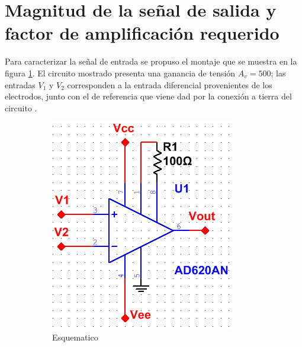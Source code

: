 \section{Magnitud de la señal de salida y factor de amplificación requerido}
Para caracterizar la señal de entrada se propuso el montaje que se muestra en la figura \ref{fig:esquematico}. El circuito mostrado presenta una ganancia de tensión $A_v = 500$; las entradas $V_1$ y $V_2$ corresponden a la entrada diferencial provenientes de los electrodos, junto con el de referencia que viene dad por la conexión a tierra del circuito .

\begin{figure}[H]
\centering
\begin{subfigure}{.4\textwidth}
  \centering
  \includegraphics[width=.8\linewidth]{Capitulo_1/Esquematico.png}
  \caption{Esquematico}
  \label{fig:esquematico}
\end{subfigure}
\begin{subfigure}{.4\textwidth}
  \centering

\end{subfigure}
\end{figure}
